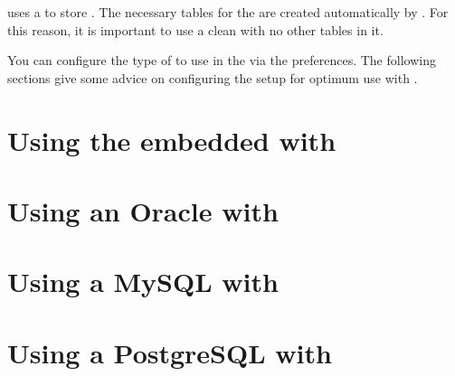 \app{} uses a \gddb{} to store \gdprojects{}. The necessary tables for the \gddb{} are created automatically by \app{}. For this reason, it is important to use a clean \gddb{} with no other tables in it.

You can configure the type of \gddb{} to use in the \ite{} via the preferences. The following sections give some advice on configuring the \gddb{} setup for optimum use with \app{}.

\section{Using the embedded \gddb{} with \app{}}


\section{Using an Oracle \gddb{} with \app{}}


\section{Using a MySQL \gddb{} with \app{}}


\section{Using a PostgreSQL \gddb{} with \app{}}

